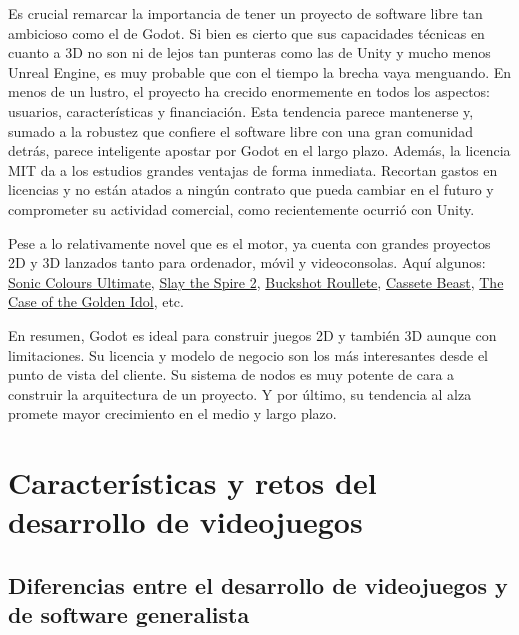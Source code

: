 Es crucial remarcar la importancia de tener un proyecto de software libre tan ambicioso como el de Godot. Si bien es cierto que sus capacidades técnicas en cuanto a 3D no son ni de lejos tan punteras como las de Unity y mucho menos Unreal Engine, es muy probable que con el tiempo la brecha vaya menguando. En menos de un lustro, el proyecto ha crecido enormemente en todos los aspectos: usuarios, características y financiación. Esta tendencia parece mantenerse y, sumado a la robustez que confiere el software libre con una gran comunidad detrás, parece inteligente apostar por Godot en el largo plazo. Además, la licencia MIT da a los estudios grandes ventajas de forma inmediata. Recortan gastos en licencias y no están atados a ningún contrato que pueda cambiar en el futuro y comprometer su actividad comercial, como recientemente ocurrió con Unity.

Pese a lo relativamente novel que es el motor, ya cuenta con grandes proyectos 2D y 3D lanzados tanto para ordenador, móvil y videoconsolas. Aquí algunos: \href{https://www.nintendo.com/es-es/Juegos/Juegos-de-Nintendo-Switch/Sonic-Colours-Ultimate-2014880.html?srsltid=AfmBOopP2Gm2S3Zo5fcoc3Ifz5E1b136K8O_6Y2vLMouJm2Zj5LI0aut}{Sonic Colours Ultimate}, \href{https://store.steampowered.com/app/2868840/Slay_the_Spire_2/}{Slay the Spire 2}, \href{https://store.steampowered.com/app/2835570/Buckshot_Roulette/}{Buckshot Roullete}, \href{https://store.steampowered.com/app/1321440/Cassette_Beasts/}{Cassete Beast}, \href{https://store.steampowered.com/app/1677770/The_Case_of_the_Golden_Idol/}{The Case of the Golden Idol}, etc.

En resumen, Godot es ideal para construir juegos 2D y también 3D aunque con limitaciones. Su licencia y modelo de negocio son los más interesantes desde el punto de vista del cliente. Su sistema de nodos es muy potente de cara a construir la arquitectura de un proyecto. Y por último, su tendencia al alza promete mayor crecimiento en el medio y largo plazo.

\section{Características y retos del desarrollo de videojuegos}

\subsection{Diferencias entre el desarrollo de videojuegos y de software generalista}

